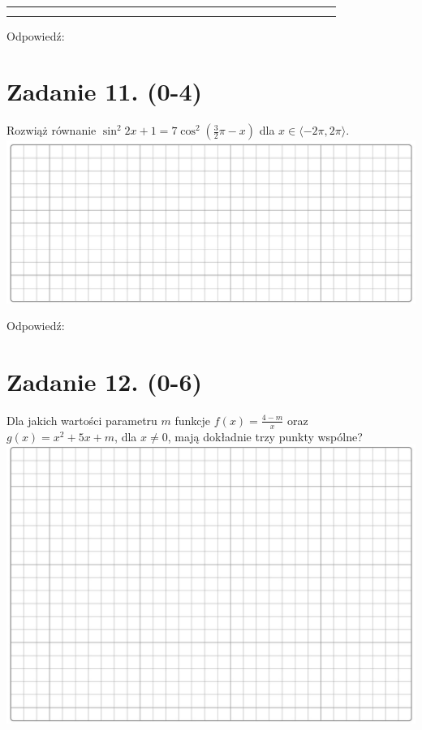 \documentclass[10pt]{article}
\begin{document}
\begin{center}
\begin{tabular}{|c|c|c|c|c|c|c|c|c|c|c|c|c|c|c|c|c|c|c|c|c|c|c|c|c|c|c|c|c|}
 &  &  &  \\
\hline
 &  &  &  &  &  &  &  &  &  &  &  &  &  &  &  &  &  &  &  &  &  &  &  &  &  &  &  &  \\
\hline
 &  &  &  &  &  &  &  &  &  &  &  &  &  &  &  &  &  &  &  &  &  &  &  &  &  &  &  &  \\
\hline
\end{tabular}
\end{center}

Odpowiedź: \(\qquad\)

\section*{Zadanie 11. (0-4)}
Rozwiąż równanie \(\sin ^{2} 2 x+1=7 \cos ^{2}\left(\frac{3}{2} \pi-x\right)\) dla \(x \in\langle-2 \pi, 2 \pi\rangle\).\\
\includegraphics[max width=\textwidth, center]{2024_11_21_599d917d55a506aace4bg-07}

Odpowiedź: \(\qquad\)

\section*{Zadanie 12. (0-6)}
Dla jakich wartości parametru \(m\) funkcje \(f(x)=\frac{4-m}{x}\) oraz \(g(x)=x^{2}+5 x+m\), dla \(x \neq 0\), mają dokładnie trzy punkty wspólne?\\
\includegraphics[max width=\textwidth, center]{2024_11_21_599d917d55a506aace4bg-07(1)}
\end{document}
